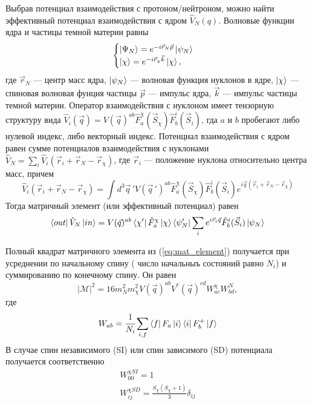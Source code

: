 Выбрав потенциал взаимодействия с протоном/нейтроном, можно найти эффективный потенциал взаимодействия с ядром $\hat{V}_{N}(q)$. Волновые функции ядра и частицы темной материи равны
\begin{equation}
	\begin{cases}
		\ket{\Psi_N} = e^{-i\vec{r}_N \vec{p}} \ket{\psi_N} \\
		\ket{\chi} = e^{-i\vec{r}_{\chi} \vec{k}} \ket{\chi}, \\
	\end{cases}
\end{equation}
где $\vec{r}_N$ --- центр масс ядра, $\ket{\psi_N}$ --- волновая функция нуклонов в ядре, $\ket{\chi}$ --- спиновая волновая фунция частицы $\vec{p}$ --- импульс ядра, $\vec{k}$ --- импульс частицы  темной материи. Оператор взаимодействия с нуклоном имеет тензорную структуру вида $\hat{V}_{i}(\vec{q}) = V(\vec{q})^{ab} \hat{F}^{\chi}_a(\vec{S}_{\chi})\hat{F}^{i}_b(\vec{S}_{i})$, гда $a$ и $b$ пробегают либо нулевой индекс, либо векторный индекс. Потенциал взаимодействия с ядром равен сумме потенциалов взаимодействия с нуклонами $\hat{V}_{N} = \sum_i{\hat{V}_{i}(\vec{r}_i + \vec{r}_N - \vec{r}_{\chi})}$, где $\vec{r}_i$ --- положение нуклона относительно центра масс, причем 
\begin{equation}
	\hat{V}_{i}(\vec{r}_i + \vec{r}_N - \vec{r}_{\chi}) = 
	\int{d^3\vec{q}\,' V(\vec{q}\,')^{ab} \hat{F}^{\chi}_a(\vec{S}_{\chi})\hat{F}^{i}_b(\vec{S}_{i})} e^{i\vec{q}(\vec{r}_i + \vec{r}_N - \vec{r}_{\chi})}
\end{equation}
Тогда матричный элемент (или эффективный потенциал) равен 
\begin{equation}
\begin{split}
	\bra{out}\hat{V}_{N}\ket{in} = V(\vec{q})^{ab} \bra{\chi'}\hat{F}^{\chi}_a\ket{\chi} 
	\bra{\psi_N'} \sum_i{e^{i\vec{r}_i\vec{q}}} \hat{F}^{i}_b(\vec{S}_{i})\ket{\psi_N}
\end{split}
\end{equation}

Полный квадрат матричного элемента из (\ref{eq:mat_element}) получается при усреднении по начальному спину (
число начальныъ состояний равно $N_i$) и суммированию по конечному спину. Он равен
\begin{equation}
	|\mathcal{M}|^2 = 16 m_N^2 m_{\chi}^2 V(\vec{q})^{ab} V^*(\vec{q})^{cd} W^{\chi}_{ac} W^{N}_{bd},
\end{equation}
где
\begin{equation}
	W_{ab} = \cfrac{1}{N_i}\sum_{i,f}{\bra{f}F_a\ket{i}\bra{i}F^+_b\ket{f}} 
\end{equation}
В случае спин независимого (SI) или спин зависимого (SD) потенциала получается соответственно
\begin{equation}
	\begin{split}
		W^{\chi SI}_{00} = 1 \\ 
		W^{\chi SD}_{ij} = \frac{S_{\chi}(S_{\chi}+1)}{3} \delta_{ij} \\
	\end{split}
\end{equation}

